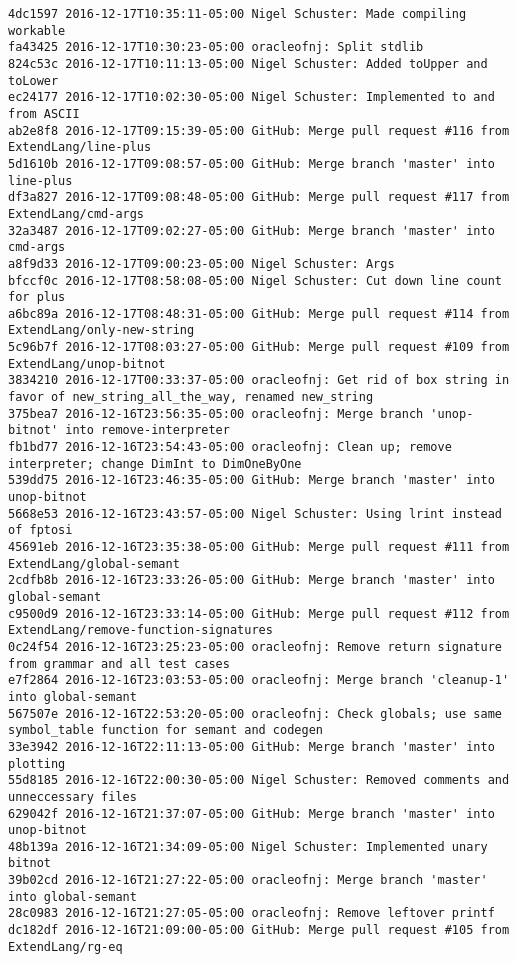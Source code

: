 \begin{lstlisting}
4dc1597 2016-12-17T10:35:11-05:00 Nigel Schuster: Made compiling workable
fa43425 2016-12-17T10:30:23-05:00 oracleofnj: Split stdlib
824c53c 2016-12-17T10:11:13-05:00 Nigel Schuster: Added toUpper and toLower
ec24177 2016-12-17T10:02:30-05:00 Nigel Schuster: Implemented to and from ASCII
ab2e8f8 2016-12-17T09:15:39-05:00 GitHub: Merge pull request #116 from ExtendLang/line-plus
5d1610b 2016-12-17T09:08:57-05:00 GitHub: Merge branch 'master' into line-plus
df3a827 2016-12-17T09:08:48-05:00 GitHub: Merge pull request #117 from ExtendLang/cmd-args
32a3487 2016-12-17T09:02:27-05:00 GitHub: Merge branch 'master' into cmd-args
a8f9d33 2016-12-17T09:00:23-05:00 Nigel Schuster: Args
bfccf0c 2016-12-17T08:58:08-05:00 Nigel Schuster: Cut down line count for plus
a6bc89a 2016-12-17T08:48:31-05:00 GitHub: Merge pull request #114 from ExtendLang/only-new-string
5c96b7f 2016-12-17T08:03:27-05:00 GitHub: Merge pull request #109 from ExtendLang/unop-bitnot
3834210 2016-12-17T00:33:37-05:00 oracleofnj: Get rid of box string in favor of new_string_all_the_way, renamed new_string
375bea7 2016-12-16T23:56:35-05:00 oracleofnj: Merge branch 'unop-bitnot' into remove-interpreter
fb1bd77 2016-12-16T23:54:43-05:00 oracleofnj: Clean up; remove interpreter; change DimInt to DimOneByOne
539dd75 2016-12-16T23:46:35-05:00 GitHub: Merge branch 'master' into unop-bitnot
5668e53 2016-12-16T23:43:57-05:00 Nigel Schuster: Using lrint instead of fptosi
45691eb 2016-12-16T23:35:38-05:00 GitHub: Merge pull request #111 from ExtendLang/global-semant
2cdfb8b 2016-12-16T23:33:26-05:00 GitHub: Merge branch 'master' into global-semant
c9500d9 2016-12-16T23:33:14-05:00 GitHub: Merge pull request #112 from ExtendLang/remove-function-signatures
0c24f54 2016-12-16T23:25:23-05:00 oracleofnj: Remove return signature from grammar and all test cases
e7f2864 2016-12-16T23:03:53-05:00 oracleofnj: Merge branch 'cleanup-1' into global-semant
567507e 2016-12-16T22:53:20-05:00 oracleofnj: Check globals; use same symbol_table function for semant and codegen
33e3942 2016-12-16T22:11:13-05:00 GitHub: Merge branch 'master' into plotting
55d8185 2016-12-16T22:00:30-05:00 Nigel Schuster: Removed comments and unneccessary files
629042f 2016-12-16T21:37:07-05:00 GitHub: Merge branch 'master' into unop-bitnot
48b139a 2016-12-16T21:34:09-05:00 Nigel Schuster: Implemented unary bitnot
39b02cd 2016-12-16T21:27:22-05:00 oracleofnj: Merge branch 'master' into global-semant
28c0983 2016-12-16T21:27:05-05:00 oracleofnj: Remove leftover printf
dc182df 2016-12-16T21:09:00-05:00 GitHub: Merge pull request #105 from ExtendLang/rg-eq

\end{lstlisting}
